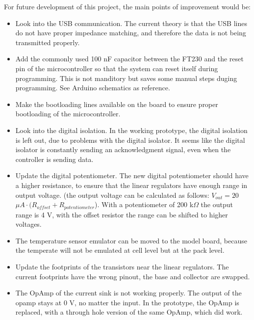 \IEEEPARstart
{F}{or} future development of this project, the main points of improvement would be:
\begin{itemize}
      \item Look into the USB communication. The current theory is that the USB lines do not have proper impedance matching, and therefore the data is not being transmitted properly.
      \item  Add the commonly used 100 nF capacitor between the FT230 and the reset pin of the microcontroller so that the system can reset itself during programming. This is not manditory but saves some manual steps duging programming. See Arduino schematics as reference.
      \item Make the bootloading lines available on the board to ensure proper bootloading of the microcontroller.
      \item Look into the digital isolation. In the working prototype, the digital isolation is left out, due to problems with the digital isolator. It seems like the digital isolator is constantly sending an acknowledgment signal, even when the controller is sending data.
      \item Update the digital potentiometer. The new digital potentiometer should have a higher resistance, to ensure that the linear regulators have enough range in output voltage. (the output voltage can be calculated as follows: $V_{out} = 20$ $\mu A \cdot (R_{offset}+R_{potentiometer}$). With a potentiometer of 200 k$\Omega$ the output range is 4 V, with the offset resistor the range can be shifted to higher voltages.
      \item The temperature sensor emulator can be moved to the model board, because the temperate will not be emulated at cell level but at the pack level.
      \item Update the footprints of the transistors near the linear regulators. The current footprints have the wrong pinout, the base and collector are swapped.
      \item The OpAmp of the current sink is not working properly. The output of the opamp stays at 0 V, no matter the input. In the prototype, the OpAmp is replaced, with a through hole version of the same OpAmp, which did work. 
\end{itemize}  